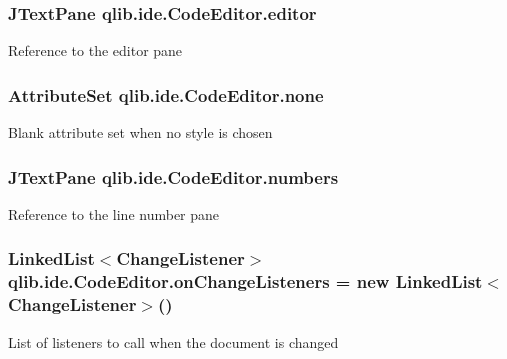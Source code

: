 \subsubsection[{\texorpdfstring{editor}{editor}}]{\setlength{\rightskip}{0pt plus 5cm}J\+Text\+Pane qlib.\+ide.\+Code\+Editor.\+editor\hspace{0.3cm}{\ttfamily [private]}}\hypertarget{classqlib_1_1ide_1_1CodeEditor_a7890793e4b90ebe797bb5e368e72e721}{}\label{classqlib_1_1ide_1_1CodeEditor_a7890793e4b90ebe797bb5e368e72e721}
Reference to the editor pane 
\subsubsection[{\texorpdfstring{none}{none}}]{\setlength{\rightskip}{0pt plus 5cm}Attribute\+Set qlib.\+ide.\+Code\+Editor.\+none\hspace{0.3cm}{\ttfamily [private]}}\hypertarget{classqlib_1_1ide_1_1CodeEditor_a108318be527559a6a6fdc044ce91f379}{}\label{classqlib_1_1ide_1_1CodeEditor_a108318be527559a6a6fdc044ce91f379}
Blank attribute set when no style is chosen 
\subsubsection[{\texorpdfstring{numbers}{numbers}}]{\setlength{\rightskip}{0pt plus 5cm}J\+Text\+Pane qlib.\+ide.\+Code\+Editor.\+numbers\hspace{0.3cm}{\ttfamily [private]}}\hypertarget{classqlib_1_1ide_1_1CodeEditor_ad9b88b89dc797c2eb6511cb5026b30da}{}\label{classqlib_1_1ide_1_1CodeEditor_ad9b88b89dc797c2eb6511cb5026b30da}
Reference to the line number pane 
\subsubsection[{\texorpdfstring{on\+Change\+Listeners}{onChangeListeners}}]{\setlength{\rightskip}{0pt plus 5cm}Linked\+List$<${\bf Change\+Listener}$>$ qlib.\+ide.\+Code\+Editor.\+on\+Change\+Listeners = new Linked\+List$<${\bf Change\+Listener}$>$()\hspace{0.3cm}{\ttfamily [private]}}\hypertarget{classqlib_1_1ide_1_1CodeEditor_abbe985cdd77e9feb1818773c377257fb}{}\label{classqlib_1_1ide_1_1CodeEditor_abbe985cdd77e9feb1818773c377257fb}
List of listeners to call when the document is changed 
